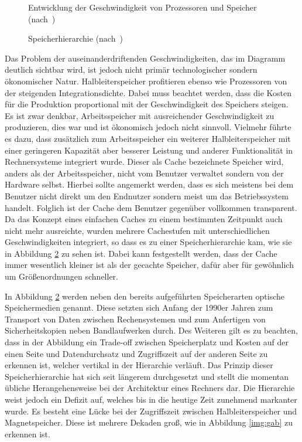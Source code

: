 \newpage

\begin{figure}[t!]\centering
    \caption[Entwicklung der Geschwindigkeit von Prozessoren und Speicher]{Entwicklung der Geschwindigkeit von Prozessoren und Speicher (nach~\textcite[180]{intro1})}
    \label{chap1:ram-cpu}
\end{figure}

\begin{figure}[b!]\centering
    \caption[Speicherhierarchie]{Speicherhierarchie (nach~\textcite[45]{stallings:os})}
    \label{chap1:mem1}
\end{figure}

Das Problem der auseinanderdriftenden Geschwindigkeiten, das im Diagramm deutlich sichtbar wird, ist jedoch nicht primär technologischer sondern ökonomischer
Natur. Halbleiterspeicher profitieren ebenso wie Prozessoren von der steigenden Integrationsdichte. Dabei muss beachtet werden, dass die Kosten für die
Produktion proportional mit der Geschwindigkeit des Speichers steigen. Es ist zwar denkbar, Arbeitsspeicher mit ausreichender Geschwindigkeit zu produzieren,
dies war und ist ökonomisch jedoch nicht sinnvoll. Vielmehr führte es dazu, dass zusätzlich zum Arbeitsspeicher ein weiterer Halbleiterspeicher mit einer
geringeren Kapazität aber besserer Leistung und anderer Funktionalität in Rechnersysteme integriert wurde. Dieser als Cache bezeichnete Speicher wird, anders
als der Arbeitsspeicher, nicht vom Benutzer verwaltet sondern von der Hardware selbst. Hierbei sollte angemerkt werden, dass es sich meistens bei dem Benutzer nicht
direkt um den Endnutzer sondern meist um das Betriebssystem handelt. Folglich ist der Cache dem Benutzer gegenüber vollkommen transparent. Da das
Konzept eines einfachen Caches zu einem bestimmten Zeitpunkt auch nicht mehr ausreichte, wurden mehrere Cachestufen mit unterschiedlichen Geschwindigkeiten
integriert, so dass es zu einer Speicherhierarchie kam, wie sie in Abbildung \ref{chap1:mem1} zu sehen ist. Dabei kann festgestellt werden, dass der Cache immer
wesentlich kleiner ist als der gecachte Speicher, dafür aber für gewöhnlich um Größenordnungen schneller.

In Abbildung \ref{chap1:mem1} werden neben den bereits aufgeführten Speicherarten optische Speichermedien genannt. Diese setzten sich Anfang der 1990er Jahren
zum Transport von Daten zwischen Rechensystemen und zum Anfertigen von Sicherheitskopien neben Bandlaufwerken durch. Des Weiteren gilt es zu beachten, dass in
der Abbildung ein Trade-off zwischen Speicherplatz und Kosten auf der einen Seite und Datendurchsatz und Zugriffszeit auf der anderen Seite zu erkennen ist,
welcher vertikal in der Hierarchie verläuft. Das Prinzip dieser Speicherhierarchie hat sich seit längerem durchgesetzt und stellt die momentan übliche
Herangehensweise bei der Architektur eines Rechners dar. Die Hierarchie weist jedoch ein Defizit auf, welches bis in die heutige Zeit zunehmend markanter wurde.
Es besteht eine Lücke bei der Zugriffszeit zwischen Halbleiterspeicher und Magnetspeicher. Diese ist mehrere Dekaden groß, wie in Abbildung \ref{img:gab} zu
erkennen ist.

